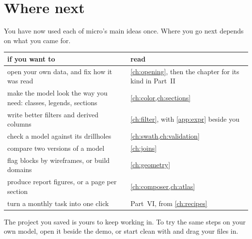 \section{Where next}\label{sec:tour-next}
You have now used each of micro's main ideas once. Where you go next depends on what you came for.

\begin{tabularx}{\linewidth}{@{}LL@{}}\toprule
if you want to & read \\ \midrule
open your own data, and fix how it was read & \cref{ch:opening}, then the chapter for its kind in Part~II \\
make the model look the way you need: classes, legends, sections & \cref{ch:color,ch:sections} \\
write better filters and derived columns & \cref{ch:filter}, with \cref{app:expr} beside you \\
check a model against its drillholes & \cref{ch:swath,ch:validation} \\
compare two versions of a model & \cref{ch:joins} \\
flag blocks by wireframes, or build domains & \cref{ch:geometry} \\
produce report figures, or a page per section & \cref{ch:composer,ch:atlas} \\
turn a monthly task into one click & Part~VI, from \cref{ch:recipes} \\
\bottomrule
\end{tabularx}

The project you saved is yours to keep working in. To try the same steps on your own model, open it beside the demo, or start clean with  and drag your files in.
